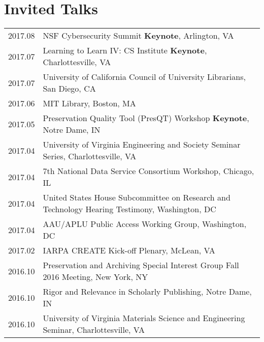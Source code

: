 \documentclass[11pt]{article}
\begin{document}
\section*{Invited Talks}
\begin{tabularx}{\textwidth}{lX}
    2017.08     & NSF Cybersecurity Summit \textbf{Keynote}, Arlington, VA \\ %
    2017.07     & Learning to Learn IV: CS Institute \textbf{Keynote}, Charlottesville, VA \\ %
    2017.07     & University of California Council of University Librarians, San Diego, CA \\
    2017.06     & MIT Library, Boston, MA \\
    2017.05     & Preservation Quality Tool (PresQT) Workshop \textbf{Keynote}, Notre Dame, IN\\%
    2017.04     & University of Virginia Engineering and Society Seminar Series, Charlottesville, VA\\
    2017.04     & 7th National Data Service Consortium Workshop, Chicago, IL\\ %
    2017.04     & United States House Subcommittee on Research and Technology Hearing Testimony, Washington, DC\\ %
    2017.04     & AAU/APLU Public Access Working Group, Washington, DC \\
    2017.02     & IARPA CREATE Kick-off Plenary, McLean, VA\\
    2016.10     & Preservation and Archiving Special Interest Group Fall 2016 Meeting, New York, NY\\ %
    2016.10     & Rigor and Relevance in Scholarly Publishing, Notre Dame, IN\\ %
    2016.10     & University of Virginia Materials Science and Engineering Seminar, Charlottesville, VA\\ %

\end{tabularx}
\end{document}
